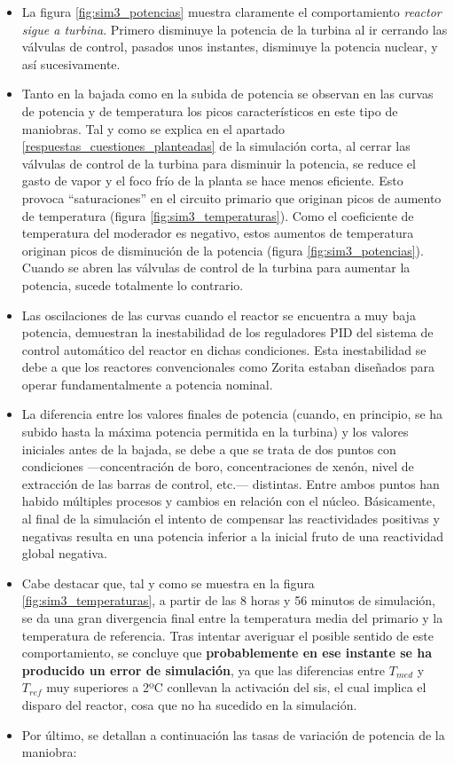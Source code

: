 \begin{itemize}
  \item La figura \ref{fig:sim3_potencias} muestra claramente el comportamiento \textit{reactor sigue a turbina}. Primero disminuye la potencia de la turbina al ir cerrando las válvulas de control, pasados unos instantes, disminuye la potencia nuclear, y así sucesivamente.
  \item Tanto en la bajada como en la subida de potencia se observan en las curvas de potencia y de temperatura los picos característicos en este tipo de maniobras. Tal y como se explica en el apartado \ref{respuestas_cuestiones_planteadas} de la simulación corta, al cerrar las válvulas de control de la turbina para disminuir la potencia, se reduce el gasto de vapor y el foco frío de la planta se hace menos eficiente. Esto provoca “saturaciones” en el circuito primario que originan picos de aumento de temperatura (figura \ref{fig:sim3_temperaturas}). Como el coeficiente de temperatura del moderador es negativo, estos aumentos de temperatura originan picos de disminución de la potencia (figura \ref{fig:sim3_potencias}). Cuando se abren las válvulas de control de la turbina para aumentar la potencia, sucede totalmente lo contrario.
  \item Las oscilaciones de las curvas cuando el reactor se encuentra a muy baja potencia, demuestran la inestabilidad de los reguladores PID del sistema de control automático del reactor en dichas condiciones. Esta inestabilidad se debe a que los reactores convencionales como Zorita estaban diseñados para operar fundamentalmente a potencia nominal.
  \item La diferencia entre los valores finales de potencia (cuando, en principio, se ha subido hasta la máxima potencia permitida en la turbina) y los valores iniciales antes de la bajada, se debe a que se trata de dos puntos con condiciones ---concentración de boro, concentraciones de xenón, nivel de extracción de las barras de control, etc.--- distintas. Entre ambos puntos han habido múltiples procesos y cambios en relación con el núcleo. Básicamente, al final de la simulación el intento de compensar las reactividades positivas y negativas resulta en una potencia inferior a la inicial fruto de una reactividad global negativa.
  \item Cabe destacar que, tal y como se muestra en la figura \ref{fig:sim3_temperaturas}, a partir de las 8 horas y 56 minutos de simulación, se da una gran divergencia final entre la temperatura media del primario y la temperatura de referencia. Tras intentar averiguar el posible sentido de este comportamiento, se concluye que \textbf{probablemente en ese instante se ha producido un error de simulación}, ya que las diferencias entre $T_{med}$ y $T_{ref}$ muy superiores a 2ºC conllevan la activación del \acrfull{sis}, el cual implica el disparo del reactor, cosa que no ha sucedido en la simulación. 
  \item Por último, se detallan a continuación las tasas de variación de potencia de la maniobra:
  

\end{itemize}
